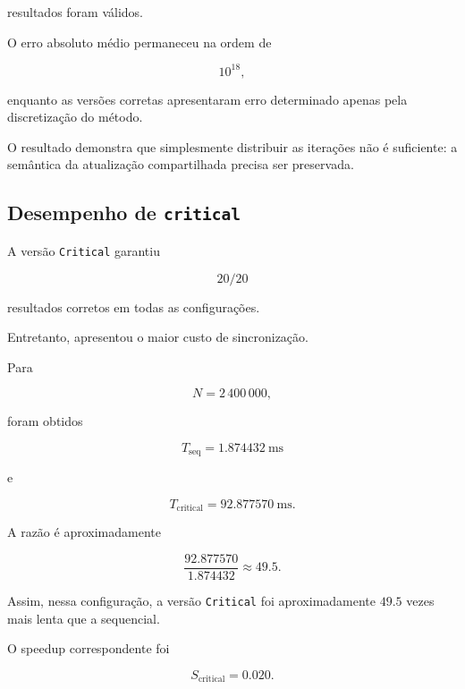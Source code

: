 resultados foram válidos.

O erro absoluto médio permaneceu na ordem de

\begin{equation}
    10^{18},
\end{equation}

enquanto as versões corretas apresentaram erro determinado apenas pela
discretização do método.

O resultado demonstra que simplesmente distribuir as iterações não é
suficiente: a semântica da atualização compartilhada precisa ser preservada.


\subsection{Desempenho de \texttt{critical}}

A versão \texttt{Critical} garantiu

\begin{equation}
    20/20
\end{equation}

resultados corretos em todas as configurações.

Entretanto, apresentou o maior custo de sincronização.

Para

\begin{equation}
    N=2\,400\,000,
\end{equation}

foram obtidos

\begin{equation}
    T_{\text{seq}}
    =
    1.874432\ \text{ms}
\end{equation}

e

\begin{equation}
    T_{\text{critical}}
    =
    92.877570\ \text{ms}.
\end{equation}

A razão é aproximadamente

\begin{equation}
    \frac{92.877570}{1.874432}
    \approx
    49.5.
\end{equation}

Assim, nessa configuração, a versão \texttt{Critical} foi aproximadamente
\(49.5\) vezes mais lenta que a sequencial.

O speedup correspondente foi

\begin{equation}
    S_{\text{critical}}
    =
    0.020.
\end{equation}

